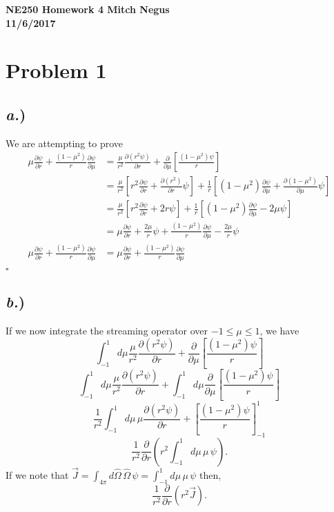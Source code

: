 \documentclass{article}
\newcommand{\tab}{\-\hspace{1cm}}
\newcommand{\p}{\partial}
\newcommand{\cur}{\vec{J}}
\newcommand{\Oh}{\hat{\Omega}}
\newcommand{\intfp}{\int_{4\pi}}
\begin{document}
\thispagestyle{empty}

{\bf {\large {NE250 Homework {4} \hfill Mitch Negus\\
		\hspace*{\fill} 11/6/2017\\ }}}
		
		
		

\section*{Problem 1}

\subsection*{\textit{a.})}

We are attempting to prove
\begin{align*}
\mu\frac{\p \psi}{\p r} + \frac{(1-\mu^2)}{r}\frac{\p \psi}{\p \mu} 
		&= \frac{\mu}{r^2}\frac{\p(r^2\psi)}{\p r} + \frac{\p}{\p \mu}\left[\frac{(1-\mu^2)\psi}{r}\right] \\
		&= \frac{\mu}{r^2}\left[r^2\frac{\p \psi}{\p r} + \frac{\p(r^2)}{\p r}\psi\right] + \frac{1}{r}\left[(1-\mu^2)\frac{\p \psi}{\p \mu} + \frac{\p(1-\mu^2)}{\p \mu}\psi\right] \\
				&= \frac{\mu}{r^2}\left[r^2\frac{\p \psi}{\p r} + 2r\psi\right] + \frac{1}{r}\left[(1-\mu^2)\frac{\p \psi}{\p \mu} - 2\mu\psi\right] \\
				&= \mu\frac{\p \psi}{\p r} + \frac{2\mu}{r}\psi + \frac{(1-\mu^2)}{r}\frac{\p \psi}{\p \mu} - \frac{2\mu}{r}\psi \\
\mu\frac{\p \psi}{\p r} + \frac{(1-\mu^2)}{r}\frac{\p \psi}{\p \mu}	&= \mu\frac{\p \psi}{\p r} + \frac{(1-\mu^2)}{r}\frac{\p \psi}{\p \mu}\\
\end{align*}
\tab\tab\tab$\square$

\subsection*{\textit{b.})}

If we now integrate the streaming operator over $-1 \leq \mu \leq 1$, we have
$$ \int_{-1}^{1} d\mu \frac{\mu}{r^2}\frac{\p(r^2\psi)}{\p r} + \frac{\p}{\p \mu}\left[\frac{(1-\mu^2)\psi}{r}\right] $$
$$ \int_{-1}^{1} d\mu \frac{\mu}{r^2}\frac{\p(r^2\psi)}{\p r} + \int_{-1}^{1} d\mu  \frac{\p}{\p \mu}\left[\frac{(1-\mu^2)\psi}{r}\right] $$
$$ \frac{1}{r^2} \int_{-1}^{1} d\mu \, \mu \frac{\p(r^2\psi)}{\p r} + \left[ \frac{(1-\mu^2)\psi}{r}\right]_{-1}^{1} $$
$$ \frac{1}{r^2} \frac{\p }{\p r} \left( r^2 \int_{-1}^{1} d\mu \, \mu \, \psi \right) .$$
If we note that $\cur = \intfp d\Oh \, \Oh \, \psi = \int_{-1}^{1} d\mu \, \mu \, \psi$ then,
$$\boxed{ \frac{1}{r^2} \frac{\p }{\p r} \left( r^2 \cur \right) }.$$
\end{document}
